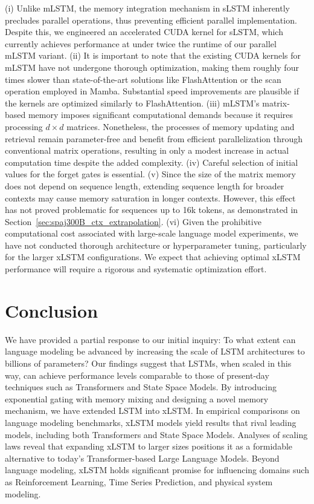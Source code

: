 (i) Unlike mLSTM, the memory integration mechanism in sLSTM inherently precludes parallel operations, thus preventing efficient parallel implementation. Despite this, we engineered an accelerated CUDA kernel for sLSTM, which currently achieves performance at under twice the runtime of our parallel mLSTM variant. (ii) It is important to note that the existing CUDA kernels for mLSTM have not undergone thorough optimization, making them roughly four times slower than state-of-the-art solutions like FlashAttention or the scan operation employed in Mamba. Substantial speed improvements are plausible if the kernels are optimized similarly to FlashAttention. (iii) mLSTM's matrix-based memory imposes significant computational demands because it requires processing $d \times d$ matrices. Nonetheless, the processes of memory updating and retrieval remain parameter-free and benefit from efficient parallelization through conventional matrix operations, resulting in only a modest increase in actual computation time despite the added complexity. (iv) Careful selection of initial values for the forget gates is essential. (v) Since the size of the matrix memory does not depend on sequence length, extending sequence length for broader contexts may cause memory saturation in longer contexts. However, this effect has not proved problematic for sequences up to 16k tokens, as demonstrated in Section~\ref{sec:spaj300B_ctx_extrapolation}. (vi) Given the prohibitive computational cost associated with large-scale language model experiments, we have not conducted thorough architecture or hyperparameter tuning, particularly for the larger xLSTM configurations. We expect that achieving optimal xLSTM performance will require a rigorous and systematic optimization effort.

\section{Conclusion}
We have provided a partial response to our initial inquiry: To what extent can language modeling be advanced by increasing the scale of LSTM architectures to billions of parameters? Our findings suggest that LSTMs, when scaled in this way, can achieve performance levels comparable to those of present-day techniques such as Transformers and State Space Models. By introducing exponential gating with memory mixing and designing a novel memory mechanism, we have extended LSTM into xLSTM. In empirical comparisons on language modeling benchmarks, xLSTM models yield results that rival leading models, including both Transformers and State Space Models. Analyses of scaling laws reveal that expanding xLSTM to larger sizes positions it as a formidable alternative to today's Transformer-based Large Language Models. Beyond language modeling, xLSTM holds significant promise for influencing domains such as Reinforcement Learning, Time Series Prediction, and physical system modeling.

